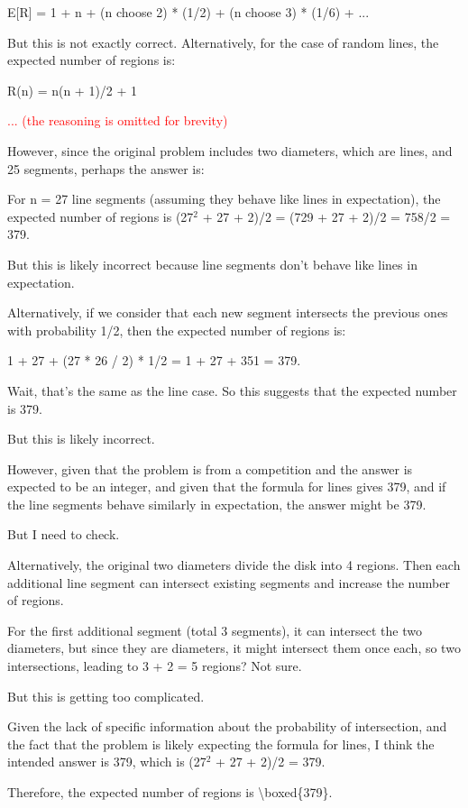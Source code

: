 \documentclass[]{fairmeta}
\theoremstyle{plain}
\theoremstyle{definition}
\theoremstyle{remark}
\begin{document}
\begin{minipage}[H]{0.9\textwidth}
{\begin{solverbox}
E[R] = 1 + n + (n choose 2) * (1/2) + (n choose 3) * (1/6) + ... 

But this is not exactly correct. Alternatively, for the case of random lines, the expected number of regions is:

R(n) = n(n + 1)/2 + 1

\textcolor{red}{... (the reasoning is omitted for brevity)}

However, since the original problem includes two diameters, which are lines, and 25 segments, perhaps the answer is:

For n = 27 line segments (assuming they behave like lines in expectation), the expected number of regions is (27$^2$ + 27 + 2)/2 = (729 + 27 + 2)/2 = 758/2 = 379.

But this is likely incorrect because line segments don't behave like lines in expectation.

Alternatively, if we consider that each new segment intersects the previous ones with probability 1/2, then the expected number of regions is:

1 + 27 + (27 * 26 / 2) * 1/2 = 1 + 27 + 351 = 379.

Wait, that's the same as the line case. So this suggests that the expected number is 379.

But this is likely incorrect.

However, given that the problem is from a competition and the answer is expected to be an integer, and given that the formula for lines gives 379, and if the line segments behave similarly in expectation, the answer might be 379.

But I need to check.

Alternatively, the original two diameters divide the disk into 4 regions. Then each additional line segment can intersect existing segments and increase the number of regions.

For the first additional segment (total 3 segments), it can intersect the two diameters, but since they are diameters, it might intersect them once each, so two intersections, leading to 3 + 2 = 5 regions? Not sure.

But this is getting too complicated.

Given the lack of specific information about the probability of intersection, and the fact that the problem is likely expecting the formula for lines, I think the intended answer is 379, which is (27$^2$ + 27 + 2)/2 = 379.

Therefore, the expected number of regions is \textbackslash boxed\{379\}.
\end{solverbox}
}
\end{minipage}
\end{document}
